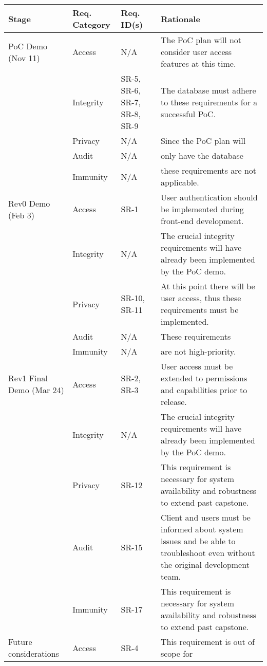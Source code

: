 \documentclass{article}
\begin{document}
\begin{longtable}[c]{|m{2cm}|m{2.6cm}|m{2cm}|m{3.8cm}|}
    \hline
    \textbf{Stage} & \textbf{Req. Category} & \textbf{Req. ID(s)} &
    \textbf{Rationale} \\
    \hline
    \endhead
    PoC Demo (Nov 11) & Access & N/A & The PoC plan will not consider user
    access features at this time.\\
    \cline{2-4}
    & Integrity & SR-5, SR-6, SR-7, SR-8, SR-9 & The database must adhere to
    these requirements for a successful PoC.\\
    \cline{2-4}
    & Privacy & N/A & Since the PoC plan will\\
    & Audit & N/A & only have the database\\
    & Immunity & N/A & these requirements are not applicable.\\
    \hline
    Rev0 Demo (Feb 3) & Access & SR-1 & User authentication should be
    implemented during front-end development.\\
    \cline{2-4}
    & Integrity & N/A & The crucial integrity requirements will have already
    been implemented by the PoC demo.\\
    \cline{2-4}
    & Privacy & SR-10, SR-11 & At this point there will be user access, thus
    these requirements must be implemented.\\
    \cline{2-4}
    & Audit & N/A & These requirements\\
    & Immunity & N/A & are not high-priority.\\
    \hline
    Rev1 Final Demo (Mar 24) & Access & SR-2, SR-3 & User access must be
    extended to permissions and capabilities prior to release.\\
    \cline{2-4}
    & Integrity & N/A & The crucial integrity requirements will have already
    been implemented by the PoC demo.\\
    \cline{2-4}
    & Privacy & SR-12 & This requirement is necessary for system availability
    and robustness to extend past capstone.\\
    \cline{2-4}
    & Audit & SR-15 & Client and users must be informed about system issues and
    be able to troubleshoot even without the original development team.\\
    \cline{2-4}
    & Immunity & SR-17 & This requirement is necessary for system availability
    and robustness to extend past capstone.\\
    \hline
    Future considerations & Access & SR-4 & This requirement is out of scope for

\end{longtable}
\end{document}
